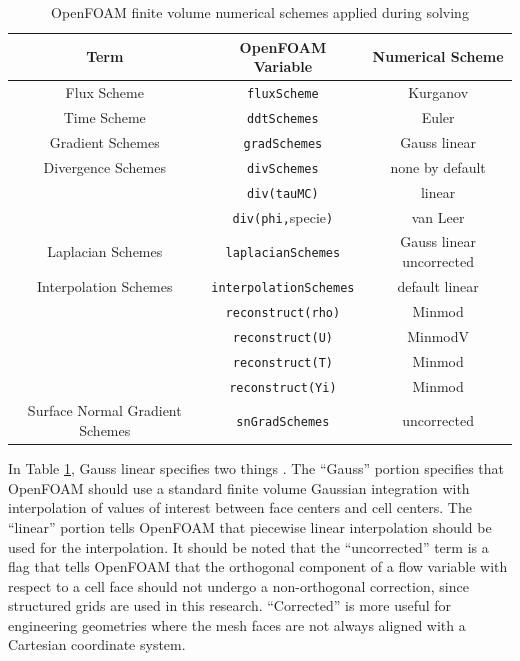 \begin{table}[t!]
\centering
\caption{OpenFOAM finite volume numerical schemes applied during solving}
\label{tab:numschemes}
\begin{tabular}{ccc}
Term & OpenFOAM Variable & Numerical Scheme \\ \hline 
Flux Scheme & \verb|fluxScheme| & Kurganov \\ 
Time Scheme & \verb|ddtSchemes| & Euler \\
Gradient Schemes & \verb|gradSchemes| & Gauss linear \\ 
Divergence Schemes & \verb|divSchemes| & none by default \\ 
& \verb|div(tauMC)| & linear \\ 
& \verb|div(phi,|specie\verb|)| & van Leer \\ 
Laplacian Schemes & \verb|laplacianSchemes| & Gauss linear uncorrected \\ 
Interpolation Schemes & \verb|interpolationSchemes| & default linear \\
& \verb|reconstruct(rho)| & Minmod \\ 
& \verb|reconstruct(U)| & MinmodV \\ 
& \verb|reconstruct(T)| & Minmod \\ 
& \verb|reconstruct(Yi)| & Minmod \\ 
Surface Normal Gradient Schemes & \verb|snGradSchemes| & uncorrected \\
\end{tabular}
\end{table}

In Table \ref{tab:numschemes}, Gauss linear specifies two things \cite{ofug}. The ``Gauss'' portion specifies that OpenFOAM should use a standard finite volume Gaussian integration \cite{gauss1815} with interpolation of values of interest between face centers and cell centers. The ``linear'' portion tells OpenFOAM that piecewise linear interpolation should be used for the interpolation. It should be noted that the ``uncorrected'' term is a flag that tells OpenFOAM that the orthogonal component of a flow variable with respect to a cell face should not undergo a non-orthogonal correction, since structured grids are used in this research. ``Corrected'' is more useful for engineering geometries where the mesh faces are not always aligned with a Cartesian coordinate system. 

